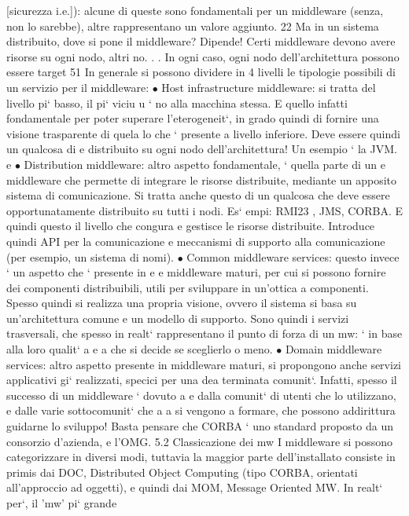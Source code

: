 \documentclass[a4paper,12pt]{article}
\begin{document}
[sicurezza i.e.]): alcune di queste sono
fondamentali per un middleware (senza, non lo sarebbe), altre rappresentano
un valore aggiunto.
22 Ma in un sistema distribuito, dove si pone il middleware? Dipende! Certi middleware
devono avere risorse su ogni nodo, altri no. . . In ogni caso, ogni nodo dell'architettura possono
essere target
51
In generale si possono dividere in 4 livelli le tipologie possibili di un servizio
per il middleware:
$\bullet$ Host infrastructure middleware: si tratta del livello pi` basso, il pi` viciu
u
`
no alla macchina stessa. E quello infatti fondamentale per poter superare
l'eterogeneit`, in grado quindi di fornire una visione trasparente di quela
lo che ` presente a livello inferiore. Deve essere quindi un qualcosa di
e
distribuito su ogni nodo dell'architettura! Un esempio ` la JVM.
e
$\bullet$ Distribution middleware: altro aspetto fondamentale, ` quella parte di un
e
middleware che permette di integrare le risorse distribuite, mediante un
apposito sistema di comunicazione. Si tratta anche questo di un qualcosa che deve essere opportunatamente distribuito su
tutti i nodi. Es`
empi: RMI23 , JMS, CORBA. E quindi questo il livello che congura e
gestisce le risorse distribuite. Introduce quindi API per la comunicazione
e meccanismi di supporto alla comunicazione (per esempio, un sistema di
nomi).
$\bullet$ Common middleware services: questo invece ` un aspetto che ` presente in
e
e
middleware maturi, per cui si possono fornire dei componenti distribuibili,
utili per sviluppare in un'ottica a componenti. Spesso quindi si realizza
una propria visione, ovvero il sistema si basa su un'architettura comune
e un modello di supporto. Sono quindi i servizi trasversali, che spesso in
realt` rappresentano il punto di forza di un mw: ` in base alla loro qualit`
a
e
a
che si decide se sceglierlo o meno.
$\bullet$ Domain middleware services: altro aspetto presente in middleware maturi,
si propongono anche servizi applicativi gi` realizzati, specici per una dea
terminata comunit`. Infatti, spesso il successo di un middleware ` dovuto
a
e
dalla comunit` di utenti che lo utilizzano, e dalle varie sottocomunit` che
a
a
si vengono a formare, che possono addirittura guidarne lo sviluppo! Basta
pensare che CORBA ` uno standard proposto da un consorzio d'azienda,
e
l'OMG.
5.2
Classicazione dei mw
I middleware si possono categorizzare in diversi modi, tuttavia la maggior parte
dell'installato consiste in primis dai DOC, Distributed Object Computing (tipo
CORBA, orientati all'approccio ad oggetti), e quindi dai MOM, Message Oriented MW. In realt` per`, il 'mw' pi` grande
\end{document}
